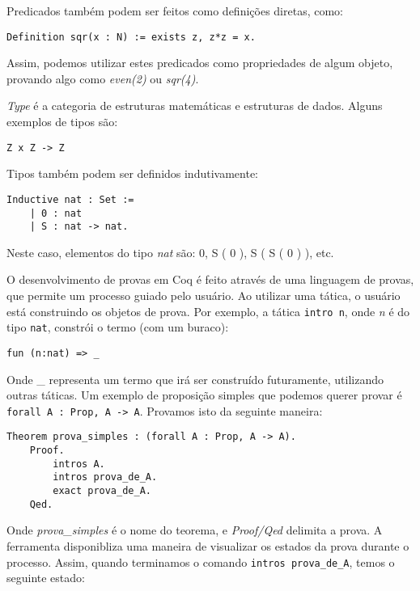 Predicados também podem ser feitos como definições diretas, como:

\begin{lstlisting}[basicstyle=\small]
    Definition sqr(x : N) := exists z, z*z = x.
\end{lstlisting}

Assim, podemos utilizar estes predicados como propriedades de algum objeto,
provando algo como \emph{even(2)} ou \emph{sqr(4)}.

\emph{Type} é a categoria de estruturas matemáticas e estruturas de dados.
Alguns exemplos de tipos são:

\begin{lstlisting}[basicstyle=\small]
    Z x Z -> Z
\end{lstlisting}

Tipos também podem ser definidos indutivamente:

\begin{lstlisting}[basicstyle=\small]
    Inductive nat : Set :=
    | 0 : nat
    | S : nat -> nat.
\end{lstlisting}

Neste caso, elementos do tipo \emph{nat} são: 0, S ( 0 ), S ( S ( 0 ) ), etc.

O desenvolvimento de provas em Coq é feito através de uma linguagem de provas,
que permite um processo guiado pelo usuário. Ao utilizar uma tática, o usuário
está construindo os objetos de prova. Por exemplo, a tática
\texttt{intro n}, onde \emph{n} é do tipo \texttt{nat}, constrói o termo (com um
buraco):

\begin{lstlisting}[basicstyle=\small]
    fun (n:nat) => _
\end{lstlisting}

Onde \_ representa um termo que irá ser construído futuramente, utilizando
outras táticas. Um exemplo de proposição simples que podemos querer provar é
\texttt{forall A : Prop, A -> A}. Provamos isto da seguinte maneira:

\begin{lstlisting}[basicstyle=\small]
    Theorem prova_simples : (forall A : Prop, A -> A).
    Proof.
        intros A.
        intros prova_de_A.
        exact prova_de_A.
    Qed.
\end{lstlisting}

Onde \emph{prova\_simples} é o nome do teorema, e \emph{Proof/Qed} delimita a
prova. A ferramenta disponibliza uma maneira de visualizar os estados da prova
durante o processo. Assim, quando terminamos o comando \texttt{intros
prova\_de\_A}, temos o seguinte estado:

